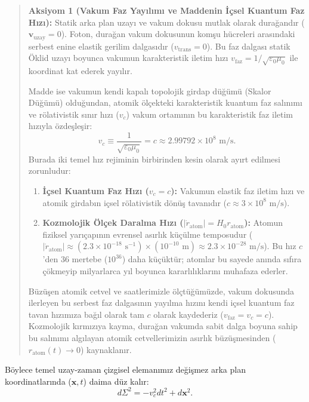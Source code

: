 \begin{quote}
    \textbf{Aksiyom 1 (Vakum Faz Yayılımı ve Maddenin İçsel Kuantum Faz Hızı):}
    Statik arka plan uzayı ve vakum dokusu mutlak olarak durağandır ($\mathbf{v}_{\mathrm{uzay}} = 0$). Foton, durağan vakum dokusunun komşu hücreleri arasındaki serbest enine elastik gerilim dalgasıdır ($v_{\mathrm{trans}} = 0$). Bu faz dalgası statik Öklid uzayı boyunca vakumun karakteristik iletim hızı $v_{\mathrm{faz}} = 1/\sqrt{\varepsilon_0\mu_0}$ ile koordinat kat ederek yayılır.

    Madde ise vakumun kendi kapalı topolojik girdap düğümü (Skalor Düğümü) olduğundan, atomik ölçekteki karakteristik kuantum faz salınımı ve rölativistik sınır hızı ($v_c$) vakum ortamının bu karakteristik faz iletim hızıyla özdeşleşir:
    \begin{equation}
        v_c \equiv \frac{1}{\sqrt{\varepsilon_0\mu_0}} = c \approx 2.99792 \times 10^8 \text{ m/s}.
        \label{eq:buzulme_hizi_tanim}
    \end{equation}
    Burada iki temel hız rejiminin birbirinden kesin olarak ayırt edilmesi zorunludur:
    \begin{enumerate}
        \item \textbf{İçsel Kuantum Faz Hızı ($v_c = c$):} Vakumun elastik faz iletim hızı ve atomik girdabın içsel rölativistik dönüş tavanıdır ($c \approx 3 \times 10^8\text{ m/s}$).
        \item \textbf{Kozmolojik Ölçek Daralma Hızı ($|\dot{r}_{\mathrm{atom}}| = H_0 r_{\mathrm{atom}}$):} Atomun fiziksel yarıçapının evrensel asırlık küçülme temposudur ($|\dot{r}_{\mathrm{atom}}| \approx (2.3 \times 10^{-18}\text{ s}^{-1}) \times (10^{-10}\text{ m}) \approx 2.3 \times 10^{-28}\text{ m/s}$). Bu hız $c$'den 36 mertebe ($10^{36}$) daha küçüktür; atomlar bu sayede anında sıfıra çökmeyip milyarlarca yıl boyunca kararlılıklarını muhafaza ederler.
    \end{enumerate}
    Büzüşen atomik cetvel ve saatlerimizle ölçtüğümüzde, vakum dokusunda ilerleyen bu serbest faz dalgasının yayılma hızını kendi içsel kuantum faz tavan hızımıza bağıl olarak tam $c$ olarak kaydederiz ($v_{\mathrm{faz}} = v_c = c$). Kozmolojik kırmızıya kayma, durağan vakumda sabit dalga boyuna sahip bu salınımı algılayan atomik cetvellerimizin asırlık büzüşmesinden ($r_{\mathrm{atom}}(t) \to 0$) kaynaklanır.
\end{quote}

Böylece temel uzay-zaman çizgisel elemanımız değişmez arka plan koordinatlarında ($\mathbf{x}, t$) daima düz kalır:
\begin{equation}
    d\Sigma^2 = -v_c^2 dt^2 + d\mathbf{x}^2.
    \label{eq:statik_arkaplan_metrigi}
\end{equation}

